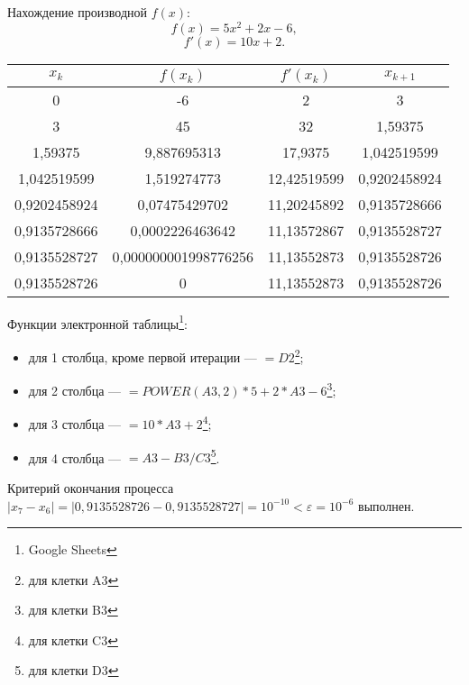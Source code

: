 \documentclass[10pt, a4paper, titlepage]{article}
\begin{document}
Нахождение производной $f(x)$:
$$f(x)=5x^2+2x-6,$$
$$f'(x)=10x+2.$$

\begin{center}
    \begin{tabular}{|c|c|c|c|}
        \hline
        $x_k$ & $f(x_k)$ & $f'(x_k)$ & $x_{k+1}$ \\ \hline
        
        0 & -6 & 2 & 3 \\ \hline
        
        3 &	45 & 32 & 1,59375 \\ \hline
        
        1,59375	& 9,887695313 &	17,9375 & 1,042519599 \\ \hline
        
        1,042519599 & 1,519274773 & 12,42519599 & 0,9202458924 \\ \hline
        
        0,9202458924 & 0,07475429702 & 11,20245892 & 0,9135728666 \\ \hline
        
        0,9135728666 & 0,0002226463642 & 11,13572867 & 0,9135528727 \\ \hline
        
        0,9135528727 & 0,000000001998776256	& 11,13552873 & 0,9135528726 \\ \hline
        
        0,9135528726 & 0 & 11,13552873 & 0,9135528726 \\ \hline
        
    \end{tabular}
\end{center}

Функции электронной таблицы\footnote{Google Sheets}:
\begin{itemize}
    \item для 1 столбца, кроме первой итерации --- $=D2$\footnote{для клетки A3};
    
    \item для 2 столбца --- $=POWER(A3, 2)*5+2*A3-6$\footnote{для клетки B3};
    
    \item для 3 столбца --- $=10*A3+2$\footnote{для клетки C3};
    
    \item для 4 столбца --- $=A3-B3/C3$\footnote{для клетки D3}.
\end{itemize}

Критерий окончания процесса $|x_7-x_6|=|0,9135528726-0,9135528727|=10^{-10}<\varepsilon=10^{-6}$ выполнен. 
\end{document}
